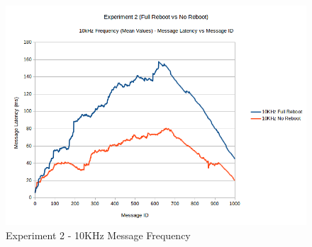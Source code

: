 \documentclass{l4proj}
\begin{document}
\begin{appendices}
\begin{figure}
\centering
\includegraphics[width=\textwidth]{images/experiment2/10khz-mean.png}
\caption{Experiment 2 - 10KHz Message Frequency}
\label{exp2-10khz}
\end{figure}

\end{appendices}




\end{document}

